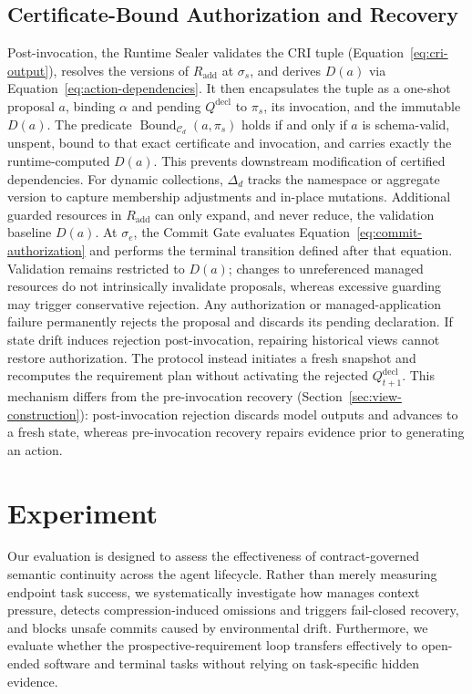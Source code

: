 \subsection{Certificate-Bound Authorization and Recovery}
\label{sec:commit-authorization}
Post-invocation, the Runtime Sealer validates the CRI tuple (Equation~\eqref{eq:cri-output}), resolves the versions of $R_{\mathrm{add}}$ at $\sigma_s$, and derives $D(a)$ via Equation~\eqref{eq:action-dependencies}. It then encapsulates the tuple as a one-shot proposal $a$, binding $\alpha$ and pending $Q^{\mathrm{decl}}$ to $\pi_s$, its invocation, and the immutable $D(a)$. The predicate $\operatorname{Bound}_{\mathcal C_d}(a,\pi_s)$ holds if and only if $a$ is schema-valid, unspent, bound to that exact certificate and invocation, and carries exactly the runtime-computed $D(a)$. This prevents downstream modification of certified dependencies.
For dynamic collections, $\Delta_d$ tracks the namespace or aggregate version to capture membership adjustments and in-place mutations. Additional guarded resources in $R_{\mathrm{add}}$ can only expand, and never reduce, the validation baseline $D(a)$.
At $\sigma_e$, the Commit Gate evaluates Equation~\eqref{eq:commit-authorization} and performs the terminal transition defined after that equation. Validation remains restricted to $D(a)$; changes to unreferenced managed resources do not intrinsically invalidate proposals, whereas excessive guarding may trigger conservative rejection. Any authorization or managed-application failure permanently rejects the proposal and discards its pending declaration.
If state drift induces rejection post-invocation, repairing historical views cannot restore authorization. The protocol instead initiates a fresh snapshot and recomputes the requirement plan without activating the rejected $Q^{\mathrm{decl}}_{t+1}$. This mechanism differs from the pre-invocation recovery (Section~\ref{sec:view-construction}): post-invocation rejection discards model outputs and advances to a fresh state, whereas pre-invocation recovery repairs evidence prior to generating an action.
\section{Experiment}
\label{sec:setup}
Our evaluation is designed to assess the effectiveness of contract-governed semantic continuity across the agent lifecycle.
Rather than merely measuring endpoint task success, we systematically investigate how \method{} manages context pressure,
detects compression-induced omissions and triggers fail-closed recovery, and blocks unsafe commits caused by environmental drift.
Furthermore, we evaluate whether the prospective-requirement loop transfers effectively to open-ended software and terminal tasks without
relying on task-specific hidden evidence.
